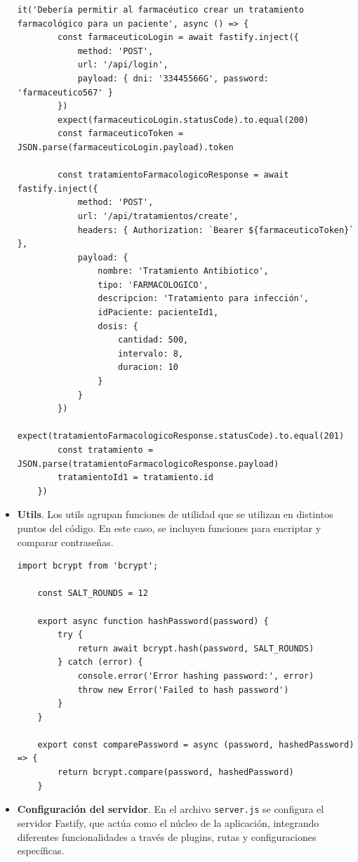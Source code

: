 \begin{itemize}
\begin{lstlisting}[caption={Ejemplo de test para creación de tratamiento}, label={lst:createTreatmentTest}]
	it('Debería permitir al farmacéutico crear un tratamiento farmacológico para un paciente', async () => {
		const farmaceuticoLogin = await fastify.inject({
			method: 'POST',
			url: '/api/login',
			payload: { dni: '33445566G', password: 'farmaceutico567' }
		})
		expect(farmaceuticoLogin.statusCode).to.equal(200)
		const farmaceuticoToken = JSON.parse(farmaceuticoLogin.payload).token
		
		const tratamientoFarmacologicoResponse = await fastify.inject({
			method: 'POST',
			url: '/api/tratamientos/create',
			headers: { Authorization: `Bearer ${farmaceuticoToken}` },
			payload: {
				nombre: 'Tratamiento Antibiotico',
				tipo: 'FARMACOLOGICO',
				descripcion: 'Tratamiento para infección',
				idPaciente: pacienteId1,
				dosis: {
					cantidad: 500,
					intervalo: 8,
					duracion: 10
				}
			}
		})
		expect(tratamientoFarmacologicoResponse.statusCode).to.equal(201)
		const tratamiento = JSON.parse(tratamientoFarmacologicoResponse.payload)
		tratamientoId1 = tratamiento.id
	})
\end{lstlisting}


\item \textbf{Utils}. Los utils agrupan funciones de utilidad que se utilizan en distintos puntos del código. En este caso, se incluyen funciones para encriptar y comparar contraseñas.
\begin{lstlisting}[caption={Funciones de utilidad para contraseñas}, label={lst:utilsPassword}]
	import bcrypt from 'bcrypt';
	
	const SALT_ROUNDS = 12
	
	export async function hashPassword(password) {
		try {
			return await bcrypt.hash(password, SALT_ROUNDS)
		} catch (error) {
			console.error('Error hashing password:', error)
			throw new Error('Failed to hash password')
		}
	}
	
	export const comparePassword = async (password, hashedPassword) => {
		return bcrypt.compare(password, hashedPassword)
	}
\end{lstlisting}


\item \textbf{Configuración del servidor}. En el archivo \texttt{server.js} se configura el servidor Fastify, que actúa como el núcleo de la aplicación, integrando diferentes funcionalidades a través de plugins, rutas y configuraciones específicas. \\


\end{itemize}
